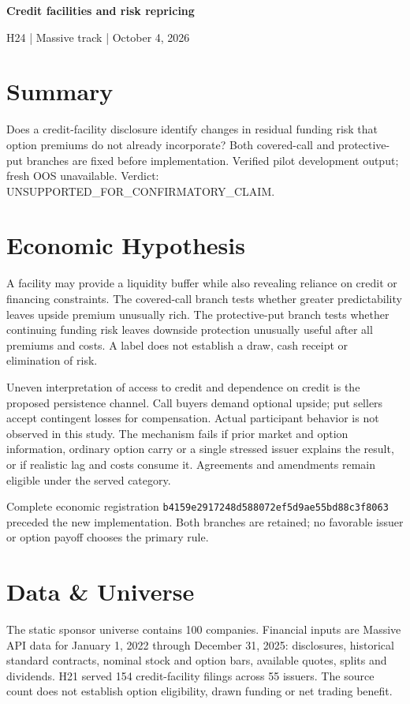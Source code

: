 \documentclass[11pt,letterpaper]{article}
\begin{document}
\begin{center}{\Large\bfseries Credit facilities and risk repricing}\par\smallskip H24 | Massive track | October 4, 2026\end{center}
\section{Summary}
Does a credit-facility disclosure identify changes in residual funding risk that option premiums do not already incorporate? Both covered-call and protective-put branches are fixed before implementation. Verified pilot development output; fresh OOS unavailable. Verdict: UNSUPPORTED\_FOR\_CONFIRMATORY\_CLAIM.

\section{Economic Hypothesis}
A facility may provide a liquidity buffer while also revealing reliance on credit or financing constraints. The covered-call branch tests whether greater predictability leaves upside premium unusually rich. The protective-put branch tests whether continuing funding risk leaves downside protection unusually useful after all premiums and costs. A label does not establish a draw, cash receipt or elimination of risk.

Uneven interpretation of access to credit and dependence on credit is the proposed persistence channel. Call buyers demand optional upside; put sellers accept contingent losses for compensation. Actual participant behavior is not observed in this study. The mechanism fails if prior market and option information, ordinary option carry or a single stressed issuer explains the result, or if realistic lag and costs consume it. Agreements and amendments remain eligible under the served category.

Complete economic registration \nolinkurl{b4159e2917248d588072ef5d9ae55bd88c3f8063} preceded the new implementation. Both branches are retained; no favorable issuer or option payoff chooses the primary rule.

\section{Data \& Universe}
The static sponsor universe contains 100 companies. Financial inputs are Massive API data for January 1, 2022 through December 31, 2025: disclosures, historical standard contracts, nominal stock and option bars, available quotes, splits and dividends. H21 served 154 credit-facility filings across 55 issuers. The source count does not establish option eligibility, drawn funding or net trading benefit.
\end{document}
